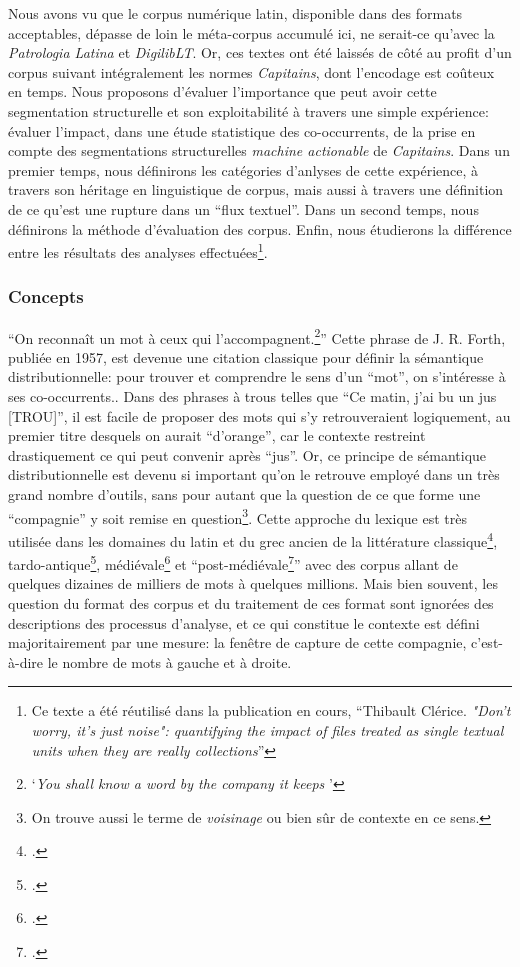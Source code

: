 Nous avons vu que le corpus numérique latin, disponible dans des formats acceptables, dépasse de loin le méta-corpus accumulé ici, ne serait-ce qu'avec la \textit{Patrologia Latina} et \textit{DigilibLT}. Or, ces textes ont été laissés de côté au profit d'un corpus suivant intégralement les normes \textit{Capitains}, dont l'encodage est coûteux en temps. Nous proposons d'évaluer l'importance que peut avoir cette segmentation structurelle et son exploitabilité à travers une simple expérience: évaluer l'impact, dans une étude statistique des co-occurrents, de la prise en compte des segmentations structurelles \textit{machine actionable} de \textit{Capitains}. Dans un premier temps, nous définirons les catégories d'anlyses de cette expérience, à travers son héritage en linguistique de corpus, mais aussi à travers une définition de ce qu'est une rupture dans un \enquote{flux textuel}. Dans un second temps, nous définirons la méthode d'évaluation des corpus. Enfin, nous étudierons la différence entre les résultats des analyses effectuées\footnote{Ce texte a été réutilisé dans la publication en cours, \enquote{Thibault Clérice. \textit{"Don't worry, it's just noise": quantifying the impact of files treated as single textual units when they are really collections}}}.

\subsubsection{Concepts}

\enquote{On reconnaît un mot à ceux qui l'accompagnent.\footnote{\enquote{\textit{You shall know a word by the company it keeps }}\textcite{firth_papers_1957}}} Cette phrase de J. R. Forth, publiée en 1957, est devenue une citation classique pour définir la sémantique distributionnelle: pour trouver et comprendre le sens d'un ``mot'', on s'intéresse à ses co-occurrents.. Dans des phrases à trous telles que \enquote{Ce matin, j'ai bu un jus {[TROU]}}, il est facile de proposer des mots qui s'y retrouveraient logiquement, au premier titre desquels on aurait \enquote{d'orange}, car le contexte restreint drastiquement ce qui peut convenir après \enquote{jus}. Or, ce principe de sémantique distributionnelle est devenu si important qu'on le retrouve employé dans un très grand nombre d'outils, sans pour autant que la question de ce que forme une \enquote{compagnie} y soit remise en question\footnote{On trouve aussi le terme de \textit{voisinage} ou bien sûr de contexte en ce sens.}. Cette approche du lexique est très utilisée dans les domaines du latin et du grec ancien de la littérature classique\footcite{gillivray_greek}, tardo-antique\footcite{munson_biblical_2017}, médiévale\footcite{guerreau_pourquoi_1989,perreaux:eau} et \enquote{post-médiévale\footcite{bloem-etal-2020-distributional}} avec des corpus allant de quelques dizaines de milliers de mots à quelques millions. Mais bien souvent, les question du format des corpus et du traitement de ces format sont ignorées des descriptions des processus d'analyse, et ce qui constitue le contexte est défini majoritairement par une mesure: la fenêtre de capture de cette compagnie, c'est-à-dire le nombre de mots à gauche et à droite. 

